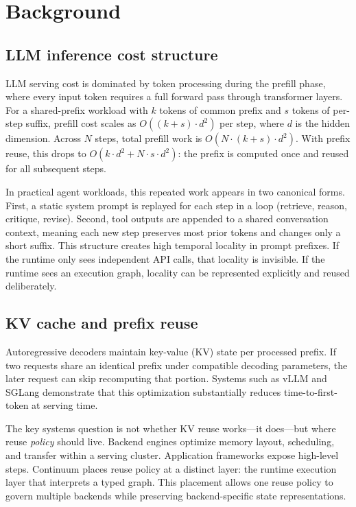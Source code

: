 \documentclass[10pt,twocolumn]{article}
\begin{document}
\section{Background}

\subsection{LLM inference cost structure}
LLM serving cost is dominated by token processing during the prefill phase, where every input token requires a full forward pass through transformer layers. For a shared-prefix workload with $k$ tokens of common prefix and $s$ tokens of per-step suffix, prefill cost scales as $O((k+s) \cdot d^2)$ per step, where $d$ is the hidden dimension. Across $N$ steps, total prefill work is $O(N \cdot (k+s) \cdot d^2)$. With prefix reuse, this drops to $O(k \cdot d^2 + N \cdot s \cdot d^2)$: the prefix is computed once and reused for all subsequent steps.

In practical agent workloads, this repeated work appears in two canonical forms. First, a static system prompt is replayed for each step in a loop (retrieve, reason, critique, revise). Second, tool outputs are appended to a shared conversation context, meaning each new step preserves most prior tokens and changes only a short suffix. This structure creates high temporal locality in prompt prefixes. If the runtime only sees independent API calls, that locality is invisible. If the runtime sees an execution graph, locality can be represented explicitly and reused deliberately.

\subsection{KV cache and prefix reuse}
Autoregressive decoders maintain key-value (KV) state per processed prefix. If two requests share an identical prefix under compatible decoding parameters, the later request can skip recomputing that portion. Systems such as vLLM \cite{kwon2023pagedattention} and SGLang \cite{zheng2024sglang} demonstrate that this optimization substantially reduces time-to-first-token at serving time.

The key systems question is not whether KV reuse works---it does---but where reuse \emph{policy} should live. Backend engines optimize memory layout, scheduling, and transfer within a serving cluster. Application frameworks expose high-level steps. Continuum places reuse policy at a distinct layer: the runtime execution layer that interprets a typed graph. This placement allows one reuse policy to govern multiple backends while preserving backend-specific state representations.
\end{document}

